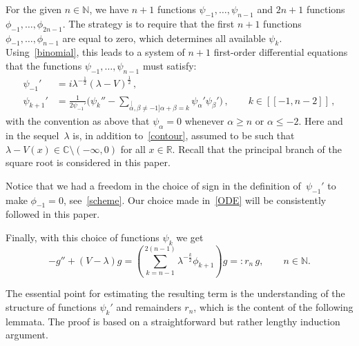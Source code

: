 For the given $n \in {\mathbb{N}}$, 
we have $n+1$ functions $\psi_{-1},\dots,\psi_{n-1}$ 
and $2n+1$ functions $\phi_{-1},\dots,\phi_{2n-1}$. 
The strategy is to require that the first $n+1$ functions
$\phi_{-1},\dots,\phi_{n-1}$
are equal to zero, which determines all available $\psi_k$.
Using~\eqref{binomial},
this leads to a system of $n+1$ first-order differential equations
that the functions $\psi_{-1},\dots,\psi_{n-1}$ must satisfy:
\begin{equation}\label{ODE}
\begin{aligned}
\psi_{-1}' 
&=  i \lambda^{-\frac 12} (\lambda - V)^\frac12 
\,,
\\
\psi_{k+1}' 
&= \frac{1}{2\psi_{-1}'}
\Bigg(
\psi_k'' - \sum_{\stackrel[\alpha,\beta \not =-1]{}{\alpha+\beta=k}}
\psi_\alpha' \psi_\beta' 
\Bigg)
\,, \qquad
k \in [[-1,n-2]] 
\,,
\end{aligned}
\end{equation}
with the convention as above that $\psi_\alpha=0$ 
whenever $\alpha \geq n$ or $\alpha \leq -2$.
Here and in the sequel~$\lambda$ is, in addition to~\eqref{contour},
assumed to be such that $\lambda-V(x) \in {\mathbb{C}}\setminus(-\infty,0)$
for all $x \in {\mathbb{R}}$. 
Recall that the principal branch of the square root is considered in this paper.

Notice that we had a freedom in the choice of sign 
in the definition of~$\psi_{-1}'$ to make $\phi_{-1}=0$, see~\eqref{scheme}.
Our choice made in~\eqref{ODE} will be consistently
followed in this paper.

Finally, with this choice of functions $\psi_k$ we get 
\begin{equation}\label{rem.phi}
-g'' + (V-\lambda)g
= 
\left(
\sum_{k=n-1}^{2(n-1)} \lambda^{-\frac{k}{2}} \phi_{k+1}
\right) g =:r_n \, g, \qquad n \in {\mathbb{N}}.
\end{equation}

The essential point for estimating the resulting term is the understanding of the structure of functions $\psi_k'$ and remainders $r_n$, which is the content of the following lemmata. The proof is based on a straightforward but rather lengthy induction argument.

